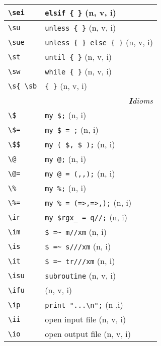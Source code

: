 \documentclass[oneside,10pt,landscape,DIV17]{scrartcl}
\begin{document}
\begin{multicols}{3}
\begin{center}
\begin{tabular}[]{|p{13mm}|p{56mm}|}
\hline \verb'\sei' & \verb'elsif { }'                  \hfill (n, v, i)\\
\hline \verb'\su'  & \verb'unless { }'                 \hfill (n, v, i)\\
\hline \verb'\sue' & \verb'unless { } else { }'        \hfill (n, v, i)\\
\hline \verb'\st'  & \verb'until { }'                  \hfill (n, v, i)\\
\hline \verb'\sw'  & \verb'while { }'                  \hfill (n, v, i)\\
\hline \verb'\s{ \sb'  & \verb'{ }'                        \hfill (n, v, i)\\
\hline
\hline
\multicolumn{2}{|r|}{\textsl{\textbf{I}dioms}}                 \\[1.0ex]
\hline \verb'\$'   & \verb'my $;'              \hfill (n, i)   \\
\hline \verb'\$='  & \verb'my $ = ;'           \hfill (n, i)   \\
\hline \verb'\$$'  & \verb'my ( $, $ );'       \hfill (n, i)   \\
\hline \verb'\@'   & \verb'my @;'              \hfill (n, i)   \\
\hline \verb'\@='  & \verb'my @ = (,,);'       \hfill (n, i)   \\
\hline \verb'\%'   & \verb'my %;'              \hfill (n, i)   \\
\hline \verb'\%='  & \verb'my % = (=>,=>,);'   \hfill (n, i)   \\
\hline \verb'\ir'  & \verb'my $rgx_ = q//;'    \hfill (n, i)   \\
\hline \verb'\im'  & \verb'$ =~ m//xm'         \hfill (n, i)   \\
\hline \verb'\is'  & \verb'$ =~ s///xm'        \hfill (n, i)   \\
\hline \verb'\it'  & \verb'$ =~ tr///xm'       \hfill (n, i)   \\
\hline \verb'\isu' & \verb'subroutine'         \hfill (n, v, i)\\
       \verb'\ifu' &                           \hfill (n, v, i)\\
\hline \verb'\ip'  & \verb'print "...\n";'     \hfill (n ,i)   \\
\hline \verb'\ii'  & open input file           \hfill (n, v, i)\\
\hline \verb'\io'  & open output file          \hfill (n, v, i)\\

\end{tabular}
\end{center}
\end{multicols}
\end{document}

